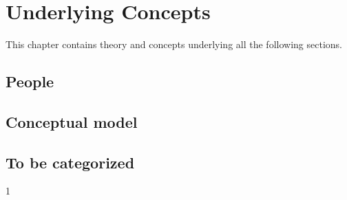 \chapter{Underlying Concepts} \label{chap:concepts}
This chapter contains theory and concepts underlying all the following sections.

\section{People}


\section{Conceptual model} \label{sec:conceptual_model}




\section{To be categorized}
1